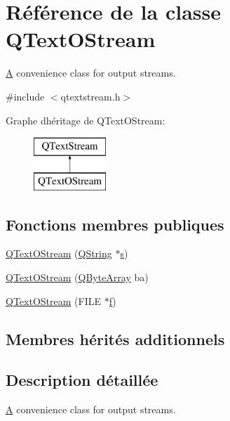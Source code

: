 \hypertarget{class_q_text_o_stream}{}\section{Référence de la classe Q\+Text\+O\+Stream}
\label{class_q_text_o_stream}


\hyperlink{class_a}{A} convenience class for output streams.  




{\ttfamily \#include $<$qtextstream.\+h$>$}

Graphe d\textquotesingle{}héritage de Q\+Text\+O\+Stream\+:\begin{figure}[H]
\begin{center}
\leavevmode
\includegraphics[height=2.000000cm]{class_q_text_o_stream}
\end{center}
\end{figure}
\subsection*{Fonctions membres publiques}
\begin{DoxyCompactItemize}
\item 
\hyperlink{class_q_text_o_stream_a8d26b74ba9b234926bb03c369f8f2df5}{Q\+Text\+O\+Stream} (\hyperlink{class_q_string}{Q\+String} $\ast$\hyperlink{060__command__switch_8tcl_a011c73f2dbb87635a3b4206c72355f6e}{s})
\item 
\hyperlink{class_q_text_o_stream_a048dde107de3d3bf8b01f9fe5c7da1ae}{Q\+Text\+O\+Stream} (\hyperlink{qcstring_8h_ad6a390648110655c217fe072d45fbcf5}{Q\+Byte\+Array} ba)
\item 
\hyperlink{class_q_text_o_stream_a9ae5cb7afb0fea378476e2607fd9ee30}{Q\+Text\+O\+Stream} (F\+I\+L\+E $\ast$\hyperlink{060__command__switch_8tcl_af6830d2c644b45088ea8f1f74a46b778}{f})
\end{DoxyCompactItemize}
\subsection*{Membres hérités additionnels}


\subsection{Description détaillée}
\hyperlink{class_a}{A} convenience class for output streams. 

